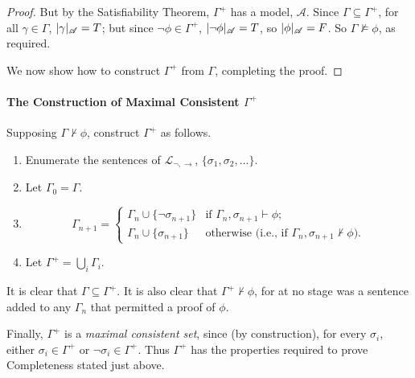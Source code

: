 {\begin{theorem}
\begin{proof}
{		But by the Satisfiability Theorem, $\Gamma^{+}$ has a model, $\mathscr{A}$. Since $\Gamma\subseteq\Gamma^{+}$, for all $\gamma\in\Gamma$, $|\gamma|_{\mathscr{A}}=T$; but since $\neg\phi\in\Gamma^{+}$, $|\neg\phi|_{\mathscr{A}}=T$, so $|\phi|_{\mathscr{A}}=F$. So $\Gamma\not\vDash\phi$, as required.
		
		We now show how to construct $\Gamma^{+}$ from $\Gamma$, completing the proof.
		}
	\end{proof}
\end{theorem}

\paragraph{The Construction of Maximal Consistent $\Gamma^{+}$}

Supposing $\Gamma\not\vdash\phi$, construct $\Gamma^{+}$ as follows. \begin{enumerate}
	\item Enumerate the sentences of $\mathcal{L}_{\neg,\to}$, $\{\sigma_{1},\sigma_{2},\ldots\}$. 
	\item Let $\Gamma_{0}=\Gamma$.
	\item \begin{equation*}
		\Gamma_{n+1} = \begin{cases}
			\Gamma_{n}\cup\{\neg\sigma_{n+1}\} &\text{if } \Gamma_{n},\sigma_{n+1}\vdash\phi;\\
			\Gamma_{n}\cup\{\sigma_{n+1}\} &\text{otherwise (i.e., if $\Gamma_{n},\sigma_{n+1}\not\vdash\phi$)}.
		\end{cases}
	\end{equation*}
	\item Let $\Gamma^{+}=\bigcup_{i} \Gamma_{i}$.
\end{enumerate}
It is clear that \emph{$\Gamma\subseteq\Gamma^{+}$}. It is also clear that \emph{$\Gamma^{+}\not\vdash\phi$}, for at no stage was a sentence added to any $\Gamma_{n}$ that permitted a proof of $\phi$. 

Finally, $\Gamma^{+}$ is a \emph{maximal consistent set}, since (by construction), for every $\sigma_{i}$, either $\sigma_{i}\in\Gamma^{+}$ or $\neg\sigma_{i}\in\Gamma^{+}$.  Thus $\Gamma^{+}$ has the properties required to prove Completeness stated just above.

}



